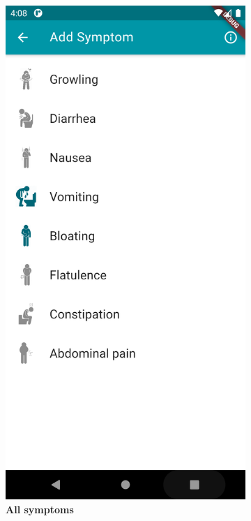 \documentclass [12pt]{article}
\begin{document}
\begin{description}[leftmargin=1cm,rightmargin=1cm]
\begin{figure}[h!]
\begin{subfigure}[tl]{0.3\linewidth}
\includegraphics[width=\linewidth]{addSymptom1.PNG}
\caption{\textbf{All symptoms}}
\end{subfigure}\hfill
\begin{subfigure}[tr]{0.3\linewidth}

\end{subfigure}
\end{figure}
\end{description}
\end{document}
